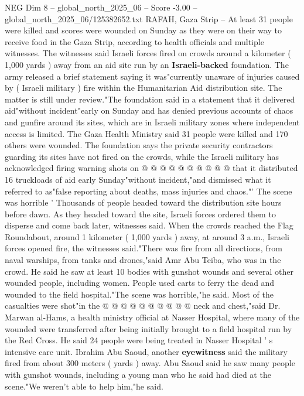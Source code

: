 \begin{textsample}{NEG Dim 8 – global\_north\_2025\_06 – Score -3.00 – global\_north\_2025\_06/125382652.txt}  \label{ex:f8_neg_027}
RAFAH, Gaza Strip -- At least 31 people were killed and scores were wounded on Sunday as they were on their way to receive food in the Gaza Strip, according to health officials and multiple witnesses.
The witnesses said Israeli forces fired on crowds around a kilometer ( 1,000 yards ) away from an aid site run by an \textbf{Israeli-backed} foundation.
The army released a brief statement saying it was"currently unaware of injuries caused by ( Israeli military ) fire within the Humanitarian Aid distribution site.
The matter is still under review."The foundation said in a statement that it delivered aid"without incident"early on Sunday and has denied previous accounts of chaos and gunfire around its sites, which are in Israeli military zones where independent access is limited.
The Gaza Health Ministry said 31 people were killed and 170 others were wounded.
The foundation says the private security contractors guarding its sites have not fired on the crowds, while the Israeli military has acknowledged firing warning shots on @ @ @ @ @ @ @ @ @ @ that it distributed 16 truckloads of aid early Sunday"without incident,"and dismissed what it referred to as"false reporting about deaths, mass injuries and chaos."' The scene was horrible ' Thousands of people headed toward the distribution site hours before dawn.
As they headed toward the site, Israeli forces ordered them to disperse and come back later, witnesses said.
When the crowds reached the Flag Roundabout, around 1 kilometer ( 1,000 yards ) away, at around 3 a.m., Israeli forces opened fire, the witnesses said."There was fire from all directions, from naval warships, from tanks and drones,"said Amr Abu Teiba, who was in the crowd.
He said he saw at least 10 bodies with gunshot wounds and several other wounded people, including women.
People used carts to ferry the dead and wounded to the field hospital."The scene was horrible,"he said.
Most of the casualties were shot"in the @ @ @ @ @ @ @ @ @ @ neck and chest,"said Dr.
Marwan al-Hams, a health ministry official at Nasser Hospital, where many of the wounded were transferred after being initially brought to a field hospital run by the Red Cross.
He said 24 people were being treated in Nasser Hospital ' s intensive care unit.
Ibrahim Abu Saoud, another \textbf{eyewitness} said the military fired from about 300 meters ( yards ) away.
Abu Saoud said he saw many people with gunshot wounds, including a young man who he said had died at the scene."We weren't able to help him,"he said.

\end{textsample}
